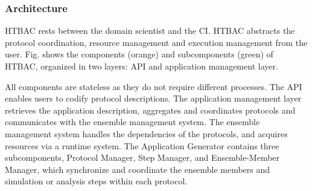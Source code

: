 




\subsubsection{Architecture}


HTBAC rests between the domain scientist and the CI. HTBAC 
abstracts the protocol coordination, resource management and execution 
management from the user. Fig.  shows the components (orange) and subcomponents 
(green) of HTBAC, organized in two layers: API and application management layer. 

All components are stateless as they do not require different processes. The API 
enables users to codify protocol descriptions. The  application management layer 
retrieves the application description, aggregates and coordinates protocols and 
communicates with the ensemble management system. The ensemble management system 
handles the dependencies of the protocols, and acquires resources via a runtime 
system. The Application Generator contains three subcomponents, Protocol Manager, 
Step Manager, and Ensemble-Member Manager, which synchronize and coordinate the 
ensemble members and simulation or analysis steps within each protocol.

